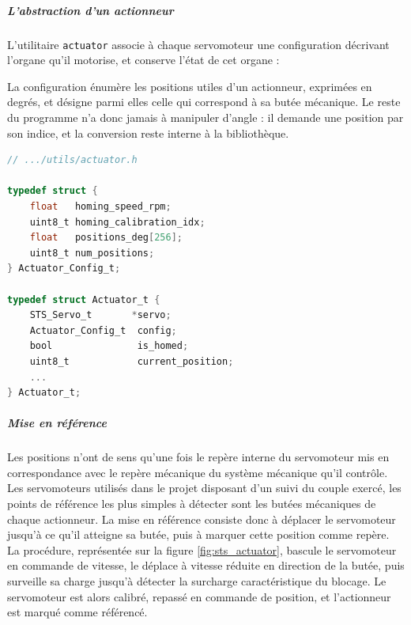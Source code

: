 \begin{minipage}{0.32\textwidth}
\subparagraph*{L'abstraction d'un actionneur} L'utilitaire \texttt{actuator}  associe à chaque servomoteur une configuration
décrivant l'organe qu'il motorise, et conserve l'état de cet organe :
	
La configuration énumère les positions utiles d'un actionneur, exprimées en degrés, et désigne parmi elles celle qui correspond à
sa butée mécanique. Le reste du programme n'a donc jamais à manipuler d'angle : il demande une position par son indice, et la
conversion reste interne à la bibliothèque.
\end{minipage}
\hfill
\begin{minipage}{0.50\textwidth}
\begin{lstlisting}[language=C, frame=tb, basicstyle=\small]
// .../utils/actuator.h

typedef struct {
    float   homing_speed_rpm;
    uint8_t homing_calibration_idx;
    float   positions_deg[256];
    uint8_t num_positions;
} Actuator_Config_t;

typedef struct Actuator_t {
    STS_Servo_t       *servo;
    Actuator_Config_t  config;
    bool               is_homed;
    uint8_t            current_position;
    ...
} Actuator_t;
\end{lstlisting}
\end{minipage}
\hfill
\hfill


\subparagraph*{Mise en référence} Les positions n'ont de sens qu'une fois le repère interne du servomoteur mis en correspondance
avec le repère mécanique du système mécanique qu'il contrôle. Les servomoteurs utilisés dans le projet disposant d'un suivi du
couple exercé, les points de référence les plus simples à détecter sont les butées mécaniques de chaque actionneur. La mise en
référence consiste donc à déplacer le servomoteur jusqu'à ce qu'il atteigne sa butée, puis à marquer cette position comme repère.\\

La procédure, représentée sur la figure \ref{fig:sts_actuator}, bascule le servomoteur en commande de vitesse, le déplace à
vitesse réduite en direction de la butée, puis surveille sa charge jusqu'à détecter la surcharge caractéristique du blocage. Le
servomoteur est alors calibré, repassé en commande de position, et l'actionneur est marqué comme référencé.\\

